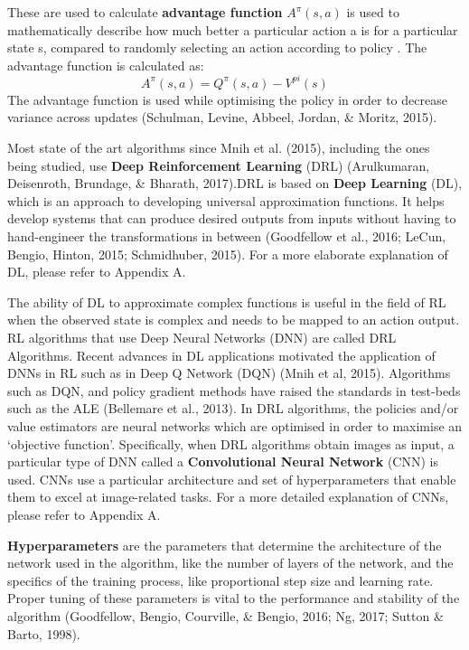 These are used to calculate \textbf{advantage function} $A^{\pi}(s,a)$  is used to mathematically describe how much better a particular action a is for a particular state s, compared to randomly selecting an action according to policy . The advantage function is calculated as:  
\[ A^{\pi}(s,a) = Q^{\pi}(s,a) - V^{pi}(s) \]
The advantage function is used while optimising the policy in order to decrease variance across updates (Schulman, Levine, Abbeel, Jordan, \& Moritz, 2015).

Most state of the art algorithms since Mnih et al. (2015), including the ones being studied, use \textbf{Deep Reinforcement Learning} (DRL) (Arulkumaran, Deisenroth, Brundage, \& Bharath, 2017).DRL is based on \textbf{Deep Learning} (DL), which is an approach to developing universal approximation functions. It helps develop systems that can produce desired outputs from inputs without having to hand-engineer the transformations in between (Goodfellow et al., 2016; LeCun, Bengio, Hinton, 2015; Schmidhuber, 2015). For a more elaborate explanation of DL, please refer to Appendix A.

The ability of DL to approximate complex functions is useful in the field of RL when the observed state is complex and needs to be mapped to an action output. RL algorithms that use Deep Neural Networks (DNN) are called DRL Algorithms. Recent advances in DL applications motivated the application of DNNs in RL such as in Deep Q Network (DQN) (Mnih et al, 2015). Algorithms such as DQN, and policy gradient methods have raised the standards in test-beds such as the ALE (Bellemare et al., 2013). In DRL algorithms, the policies and/or value estimators are neural networks which are optimised in order to maximise an ‘objective function’. Specifically, when DRL algorithms obtain images as input, a particular type of DNN called a \textbf{Convolutional Neural Network} (CNN) is used. CNNs use a particular architecture and set of hyperparameters that enable them to excel at image-related tasks. For a more detailed explanation of CNNs, please refer to Appendix A.

\textbf{Hyperparameters} are the parameters that determine the architecture of the network used in the algorithm, like the number of layers of the network, and the specifics of the training process, like proportional step size and learning rate. Proper tuning of these parameters is vital to the performance and stability of the algorithm (Goodfellow, Bengio, Courville, \& Bengio, 2016; Ng, 2017; Sutton \& Barto, 1998).

